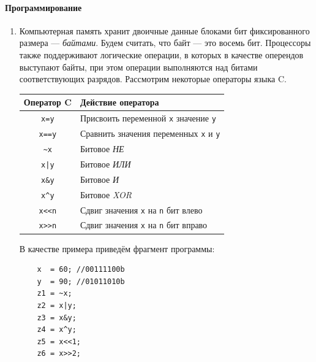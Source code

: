 \paragraph{Программирование}
\begin{enumerate}
    \item Компьютерная память хранит двоичные данные блоками бит фиксированного размера --- \emph{байтами}. Будем считать, что байт --- это восемь бит. Процессоры также поддерживают логические операции, в которых в качестве оперендов выступают байты, при этом операции выполняются над битами соответствующих разрядов. Рассмотрим некоторые операторы языка C. 
    \begin{center}
        \begin{tabular}{c|l}
            \hline\hline
            Оператор C & Действие оператора\\
            \hline\hline
            \verb"x=y"  &Присвоить переменной \verb"x" значение \verb"y"\\
            \verb"x==y" &Сравнить значения переменных \verb"x" и \verb"y"\\
            \verb"~x"   &Битовое \emph{НЕ}\\
            \verb"x|y"  &Битовое \emph{ИЛИ}\\
            \verb"x&y"  &Битовое \emph{И}\\
            \verb"x^y"  &Битовое \emph{XOR}\\
            \verb"x<<n" &Сдвиг значения \verb"x" на \verb"n" бит влево\\
            \verb"x>>n" &Сдвиг значения \verb"x" на \verb"n" бит вправо\\
            \hline
        \end{tabular}
    \end{center}
    
    В качестве примера приведём фрагмент программы:
\begin{verbatim}    
    x  = 60; //00111100b
    y  = 90; //01011010b
    z1 = ~x;
    z2 = x|y;
    z3 = x&y;
    z4 = x^y;
    z5 = x<<1;
    z6 = x>>2;
\end{verbatim}


\end{enumerate}
